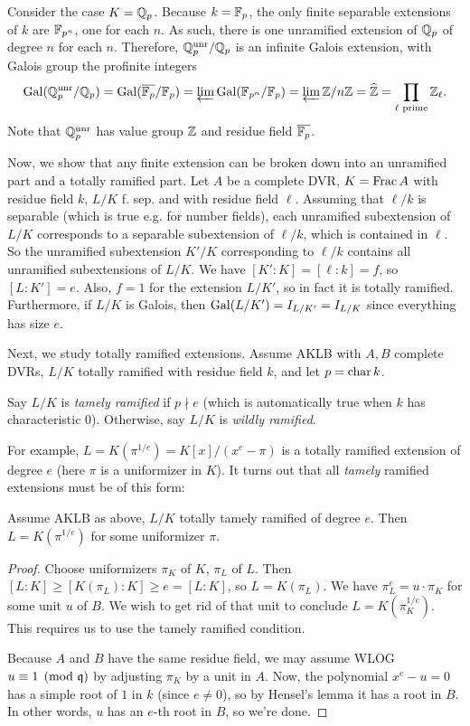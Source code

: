 \documentclass[11pt]{amsart}
\begin{document}
\begin{exm}
Consider the case $K = \mathbb{Q}_p$. Because $k = \mathbb{F}_p$, the only finite separable extensions of $k$ are $\mathbb{F}_{p^n}$, one for each $n$. As such, there is one unramified extension of $\mathbb{Q}_p$ of degree $n$ for each $n$. Therefore, $\mathbb{Q}_p^{\operatorname{unr}}/\mathbb{Q}_p$ is an infinite Galois extension, with Galois group the profinite integers
\[\operatorname{Gal}(\mathbb{Q}_p^{\operatorname{unr}}/\mathbb{Q}_p) = \operatorname{Gal}(\overline{\mathbb{F}_p}/\mathbb{F}_p) = \varprojlim \operatorname{Gal}(\mathbb{F}_{p^n}/\mathbb{F}_p) = \varprojlim \mathbb{Z}/n\mathbb{Z} = \widehat{\mathbb{Z}} = \prod_{\ell \text{ prime}} \mathbb{Z}_{\ell}.\]
Note that $\mathbb{Q}_p^{\operatorname{unr}}$ has value group $\mathbb{Z}$ and residue field $\overline{\mathbb{F}_p}$.
\end{exm}

Now, we show that any finite extension can be broken down into an unramified part and a totally ramified part. Let $A$ be a complete DVR, $K = \operatorname{Frac} A$ with residue field $k$, $L/K$ f. sep. and with residue field $\ell$. Assuming that $\ell/k$ is separable (which is true e.g. for number fields), each unramified subextension of $L/K$ corresponds to a separable subextension of $\ell/k$, which is contained in $\ell$. So the unramified subextension $K'/K$ corresponding to $\ell/k$ contains all unramified subextensions of $L/K$. We have $[K':K] = [\ell:k] = f$, so $[L:K'] = e$. Also, $f = 1$ for the extension $L/K'$, so in fact it is totally ramified. Furthermore, if $L/K$ is Galois, then $\operatorname{Gal}(L/K') = I_{L/K'} = I_{L/K}$ since everything has size $e$.

Next, we study totally ramified extensions. Assume AKLB with $A,B$ complete DVRs, $L/K$ totally ramified with residue field $k$, and let $p = \operatorname{char} k$. 

\begin{defn}
Say $L/K$ is \emph{tamely ramified} if $p\nmid e$ (which is automatically true when $k$ has characteristic 0). Otherwise, say $L/K$ is \emph{wildly ramified}.
\end{defn}

For example, $L = K(\pi^{1/e}) = K[x]/(x^e - \pi)$ is a totally ramified extension of degree $e$ (here $\pi$ is a uniformizer in $K$). It turns out that all \emph{tamely} ramified extensions must be of this form:

\begin{thm}
\label{TotallyTamelyRam}
Assume AKLB as above, $L/K$ totally tamely ramified of degree $e$. Then $L = K(\pi^{1/e})$ for some uniformizer $\pi$.
\end{thm}

\begin{proof}
Choose uniformizers $\pi_K$ of $K$, $\pi_L$ of $L$. Then $[L:K]\ge [K(\pi_L):K] \ge e = [L:K]$, so $L = K(\pi_L)$. We have $\pi_L^e = u\cdot \pi_K$ for some unit $u$ of $B$. We wish to get rid of that unit to conclude $L = K(\pi_K^{1/e})$. This requires us to use the tamely ramified condition.

Because $A$ and $B$ have the same residue field, we may assume WLOG $u\equiv 1\pmod{\mathfrak{q}}$ by adjusting $\pi_K$ by a unit in $A$. Now, the polynomial $x^e - u = 0$ has a simple root of $1$ in $k$ (since $e\neq 0$), so by Hensel's lemma it has a root in $B$. In other words, $u$ has an $e$-th root in $B$, so we're done.
\end{proof}
\end{document}
